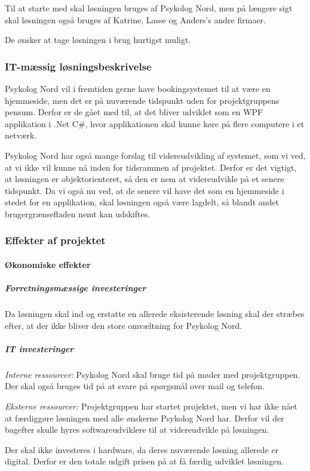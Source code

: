 Til at starte med skal løsningen bruges af Psykolog Nord, men på længere sigt skal løsningen også bruges af Katrine, Lasse og Anders's andre firmaer.

De ønsker at tage løsningen i brug hurtigst muligt.

\subsubsection{IT-mæssig løsningsbeskrivelse}

Psykolog Nord vil i fremtiden gerne have bookingsystemet til at være en hjemmeside, men det er på nuværende tidspunkt uden for projektgruppens pensum.
Derfor er de gået med til, at det bliver udviklet som en WPF applikation i .Net C\#, hvor applikationen skal kunne køre på flere computere i et netværk.

Psykolog Nord har også mange forslag til videreudvikling af systemet, som vi ved, at vi ikke vil kunne nå inden for tidsrammen af projektet.
Derfor er det vigtigt, at løsningen er objektorienteret, så den er nem at videreudvikle på et senere tidspunkt.
Da vi også nu ved, at de senere vil have det som en hjemmeside i stedet for en applikation, skal løsningen også være lagdelt, så blandt andet brugergrænsefladen nemt kan udskiftes.

\subsubsection{Effekter af projektet}
\paragraph*{Økonomiske effekter}
\subparagraph*{Forretningsmæssige investeringer}

Da løsningen skal ind og erstatte en allerede eksisterende løsning skal der stræbes efter, at der ikke bliver den store omvæltning for Psykolog Nord.

\subparagraph{IT investeringer}

\textit{Interne ressourcer:} Psykolog Nord skal bruge tid på møder med projektgruppen. Der skal også bruges tid på at svare på spørgsmål over mail og telefon.

\textit{Eksterne ressourcer:} Projektgruppen har startet projektet, men vi har ikke nået at færdiggøre løsningen med alle ønskerne Psykolog Nord har.
Derfor vil der bagefter skulle hyres softwareudviklere til at videreudvikle på løsningen.

Der skal ikke investeres i hardware, da deres nuværende løsning allerede er digital. Derfor er den totale udgift prisen på at få færdig udviklet løsningen.

